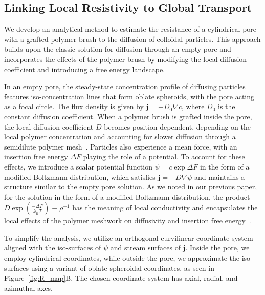 \documentclass[12pt, a4paper]{article}
\begin{document}

\subsection{Linking Local Resistivity to Global Transport}

We develop an analytical method to estimate the resistance of a cylindrical pore with a grafted polymer brush to the diffusion of colloidal particles. 
This approach builds upon the classic solution for diffusion through an empty pore and incorporates the effects of the polymer brush by modifying the local diffusion coefficient and introducing a free energy landscape.

In an empty pore, the steady-state concentration profile of diffusing particles features iso-concentration lines that form oblate spheroids, with the pore acting as a focal circle.
The flux density is given by $\mathbf{j} = -D_0 \nabla c$, where $D_0$ is the constant diffusion coefficient.
When a polymer brush is grafted inside the pore, the local diffusion coefficient $D$ becomes position-dependent, depending on the local polymer concentration and accounting for slower diffusion through a semidilute polymer mesh~\cite{Cai2011}.
Particles also experience a mean force, with an insertion free energy $\Delta F$ playing the role of a potential. To account for these effects, we introduce a scalar potential function $\psi = c\exp{\Delta F}$ in the form of a modified Boltzmann distribution, which satisfies $\mathbf{j} = -D \nabla \psi$ and maintains a structure similar to the empty pore solution.
As we noted in our previous paper, for the solution in the form of a modified Boltzmann distribution, the product $D \exp\left( \frac{-\Delta F}{k_B T} \right) \equiv \rho^{-1}$ has the meaning of local conductivity and encapsulates the local effects of the polymer meshwork on diffusivity and insertion free energy~\cite{Laktionov2023}.

To simplify the analysis, we utilize an orthogonal curvilinear coordinate system aligned with the iso-surfaces of $\psi$ and stream surfaces of $\bm{j}$.
Inside the pore, we employ cylindrical coordinates, while outside the pore, we approximate the iso-surfaces using a variant of oblate spheroidal coordinates, as seen in Figure~\ref{fig:R_map}B. The chosen coordinate system has axial, radial, and azimuthal axes.
\end{document}
